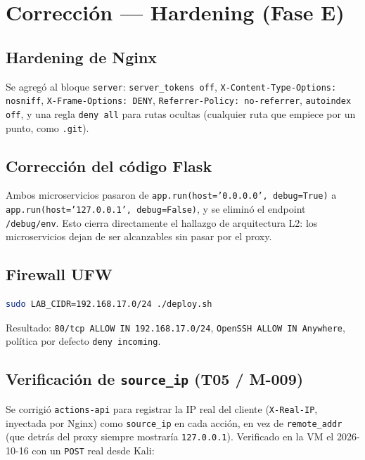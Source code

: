 \documentclass[journal]{IEEEtran}
\begin{document}
\section{Corrección --- Hardening (Fase E)}
\label{sec:hardening}

\subsection{Hardening de Nginx}

Se agregó al bloque \texttt{server}: \texttt{server\_tokens off},
\texttt{X-Content-Type-Options: nosniff}, \texttt{X-Frame-Options: DENY},
\texttt{Referrer-Policy: no-referrer}, \texttt{autoindex off}, y una regla
\texttt{deny all} para rutas ocultas (cualquier ruta que empiece por un
punto, como \texttt{.git}).

\subsection{Corrección del código Flask}

Ambos microservicios pasaron de \texttt{app.run(host='0.0.0.0', debug=True)}
a \texttt{app.run(host='127.0.0.1', debug=False)}, y se eliminó el endpoint
\texttt{/debug/env}. Esto cierra directamente el hallazgo de arquitectura L2:
los microservicios dejan de ser alcanzables sin pasar por el proxy.

\subsection{Firewall UFW}

\begin{lstlisting}[language=bash]
sudo LAB_CIDR=192.168.17.0/24 ./deploy.sh
\end{lstlisting}

Resultado: \texttt{80/tcp ALLOW IN 192.168.17.0/24}, \texttt{OpenSSH ALLOW IN
Anywhere}, política por defecto \texttt{deny incoming}.

\subsection{Verificación de \texttt{source\_ip} (T05 / M-009)}

Se corrigió \texttt{actions-api} para registrar la IP real del cliente
(\texttt{X-Real-IP}, inyectada por Nginx) como \texttt{source\_ip} en cada
acción, en vez de \texttt{remote\_addr} (que detrás del proxy siempre
mostraría \texttt{127.0.0.1}). Verificado en la VM el 2026-10-16 con un
\texttt{POST} real desde Kali:
\end{document}
